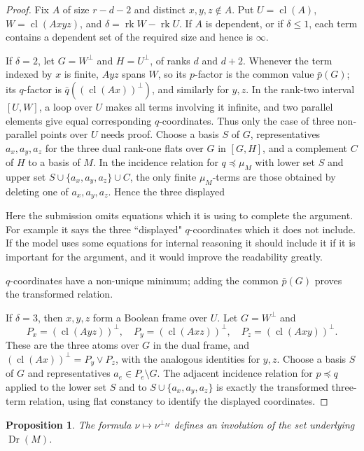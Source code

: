 \documentclass[12pt]{article}
\newcommand{\Dr}{\operatorname{Dr}}
\newcommand{\rk}{\operatorname{rk}}
\newcommand{\cl}{\operatorname{cl}}
\newtheorem{proposition}{Proposition}
\newcommand{\review}[1]{\begin{reviewbox}#1\end{reviewbox}}
\begin{document}
\begin{proof}
Fix $A$ of size $r-d-2$ and distinct $x,y,z\notin A$.  Put
$U=\cl(A)$, $W=\cl(Axyz)$, and $\delta=\rk W-\rk U$.  If $A$ is
dependent, or if $\delta\le1$, each term contains a dependent set of the
required size and hence is $\infty$.

If $\delta=2$, let $G=W^\perp$ and $H=U^\perp$, of ranks $d$ and
$d+2$.  Whenever the term indexed by $x$ is finite, $Ayz$ spans $W$,
so its $p$-factor is the common value $\bar p(G)$; its $q$-factor is
$\bar q((\cl(Ax))^\perp)$, and similarly for $y,z$.  In the rank-two
interval $[U,W]$, a loop over $U$ makes all terms involving it
infinite, and two parallel elements give equal corresponding
$q$-coordinates.  Thus only the case of three non-parallel points over
$U$ needs proof.  Choose a basis $S$ of $G$, representatives
$a_x,a_y,a_z$ for the three dual rank-one flats over $G$ in $[G,H]$,
and a complement $C$ of $H$ to a basis of $M$.  In the incidence
relation for $q\preceq\mu_M$ with lower set $S$ and upper set
$S\cup\{a_x,a_y,a_z\}\cup C$, the only finite $\mu_M$-terms are those
obtained by deleting one of $a_x,a_y,a_z$.  Hence the three displayed
\review{Here the submission omits equations which it is using to complete the argument. For example it says the three ``displayed" $q$-coordinates which it does not include. If the model uses some equations for internal reasoning it should include it if it is important for the argument, and it would improve the readability greatly. }
$q$-coordinates have a non-unique minimum; adding the common
$\bar p(G)$ proves the transformed relation.

If $\delta=3$, then $x,y,z$ form a Boolean frame over $U$.  Let
$G=W^\perp$ and
\[
 P_x=(\cl(Ayz))^\perp,\quad P_y=(\cl(Axz))^\perp,\quad
 P_z=(\cl(Axy))^\perp .
\]
These are the three atoms over $G$ in the dual frame, and
$(\cl(Ax))^\perp=P_y\vee P_z$, with the analogous identities for
$y,z$.  Choose a basis $S$ of $G$ and representatives
$a_e\in P_e\setminus G$.  The adjacent incidence relation for
$p\preceq q$ applied to the lower set $S$ and to
$S\cup\{a_x,a_y,a_z\}$ is exactly the transformed three-term relation,
using flat constancy to identify the displayed coordinates.
\end{proof}

\begin{proposition}\label{prop:set}
The formula $\nu\mapsto\nu^{\perp_M}$ defines an involution of the set
underlying $\Dr(M)$.
\end{proposition}
\end{document}
